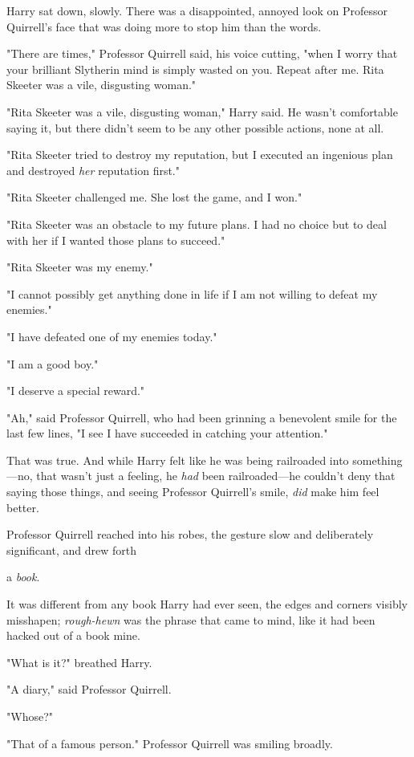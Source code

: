 Harry sat down, slowly. There was a disappointed, annoyed look on Professor
Quirrell's face that was doing more to stop him than the words.

"There are times," Professor Quirrell said, his voice cutting, "when I worry
that your brilliant Slytherin mind is simply wasted on you. Repeat after me.
Rita Skeeter was a vile, disgusting woman."

"Rita Skeeter was a vile, disgusting woman," Harry said. He wasn't comfortable
saying it, but there didn't seem to be any other possible actions, none at all.

"Rita Skeeter tried to destroy my reputation, but I executed an ingenious plan
and destroyed \emph{her} reputation first."

"Rita Skeeter challenged me. She lost the game, and I won."

"Rita Skeeter was an obstacle to my future plans. I had no choice but to deal
with her if I wanted those plans to succeed."

"Rita Skeeter was my enemy."

"I cannot possibly get anything done in life if I am not willing to defeat my
enemies."

"I have defeated one of my enemies today."

"I am a good boy."

"I deserve a special reward."

"Ah," said Professor Quirrell, who had been grinning a benevolent smile for the
last few lines, "I see I have succeeded in catching your attention."

That was true. And while Harry felt like he was being railroaded into
something---no, that wasn't just a feeling, he \emph{had} been railroaded---he
couldn't deny that saying those things, and seeing Professor Quirrell's smile,
\emph{did} make him feel better.

Professor Quirrell reached into his robes, the gesture slow and deliberately
significant, and drew forth{\el}

{\el} a \emph{book}.

It was different from any book Harry had ever seen, the edges and corners
visibly misshapen; \emph{rough-hewn} was the phrase that came to mind, like it
had been hacked out of a book mine.

"What is it?" breathed Harry.

"A diary," said Professor Quirrell.

"Whose?"

"That of a famous person." Professor Quirrell was smiling broadly.

